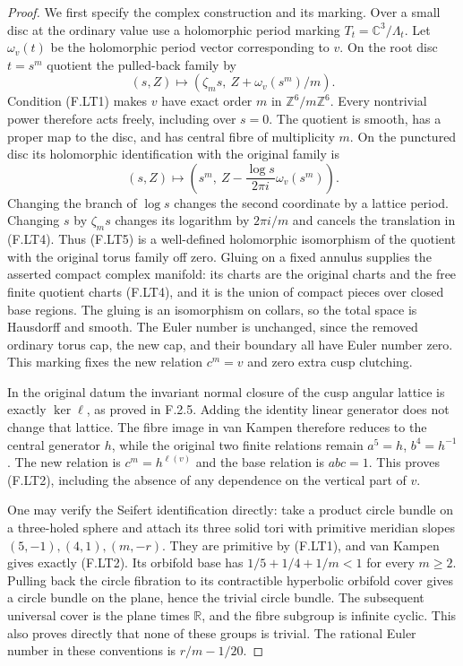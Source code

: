 \begin{proof}
We first specify the complex construction and its marking.
Over a small disc at the ordinary value use a holomorphic
period marking
$T_t=\mathbb C^3/\Lambda_t$.
Let $\omega_v(t)$ be the holomorphic period vector
corresponding to $v$.
On the root disc $t=s^m$ quotient the pulled-back family by
\[
 (s,Z)\longmapsto
   (\zeta_m s,\ Z+\omega_v(s^m)/m).
\tag{F.LT4}
\]
Condition (F.LT1) makes $v$ have exact order $m$
in $\mathbb Z^6/m\mathbb Z^6$.
Every nontrivial power therefore acts freely, including
over $s=0$.
The quotient is smooth, has a proper map to the disc,
and has central fibre of multiplicity $m$.
On the punctured disc its holomorphic identification with
the original family is
\[
 (s,Z)\longmapsto
 \left(s^m,\ Z-\frac{\log s}{2\pi i}\omega_v(s^m)\right).
\tag{F.LT5}
\]
Changing the branch of $\log s$ changes the second
coordinate by a lattice period.
Changing $s$ by $\zeta_m s$ changes its logarithm by
$2\pi i/m$ and cancels the translation in (F.LT4).
Thus (F.LT5) is a well-defined holomorphic isomorphism
of the quotient with the original torus family off zero.
Gluing on a fixed annulus supplies the asserted compact
complex manifold: its charts are the original charts
and the free finite quotient charts (F.LT4), and it is
the union of compact pieces over closed base regions.
The gluing is an isomorphism on collars, so the total
space is Hausdorff and smooth.
The Euler number is unchanged, since the removed
ordinary torus cap, the new cap, and their boundary
all have Euler number zero.
This marking fixes the new relation $c^m=v$ and
zero extra cusp clutching.

In the original datum the invariant normal closure
of the cusp angular lattice is exactly $\ker\ell$,
as proved in F.2.5.
Adding the identity linear generator does not change
that lattice.
The fibre image in van Kampen therefore reduces to
the central generator $h$, while the original two
finite relations remain $a^5=h$, $b^4=h^{-1}$.
The new relation is $c^m=h^{\ell(v)}$ and the base
relation is $abc=1$.
This proves (F.LT2), including the absence of any
dependence on the vertical part of $v$.

One may verify the Seifert identification directly:
take a product circle bundle on a three-holed sphere
and attach its three solid tori with primitive meridian
slopes $(5,-1),(4,1),(m,-r)$.
They are primitive by (F.LT1), and van Kampen gives
exactly (F.LT2).
Its orbifold base has
$1/5+1/4+1/m<1$ for every $m\ge2$.
Pulling back the circle fibration to its contractible
hyperbolic orbifold cover gives a circle bundle on
the plane, hence the trivial circle bundle.
The subsequent universal cover is the plane times
$\mathbb R$, and the fibre subgroup is infinite cyclic.
This also proves directly that none of these groups
is trivial.
The rational Euler number in these conventions is
$r/m-1/20$.


\end{proof}
